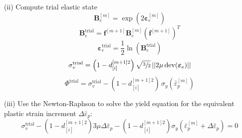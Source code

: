 \documentclass[sn-mathphys,Numbered]{sn-jnl}%
\newcommand{\bb}{\boldsymbol}
\begin{document}
\begin{appendices}
\begin{algorithm}[htbp]
(ii) Compute trial elastic state
\begin{equation}
	\bb{B}_{e}^{[m]} = \exp\left({2\boldsymbol{\varepsilon}_{e}^{[m]}}\right) \nonumber
\end{equation}
\begin{equation}
	\bb{B}^{\text{trial}}_e = \bb{f}^{[m+1]}\bb{B}^{[m]}_e \left(\bb{f}^{[m+1]}\right)^{T}\nonumber
\end{equation}
\begin{equation}
	\boldsymbol{\varepsilon}^{\text{trial}}_e = \frac{1}{2} \ln \left(\textbf{B}^{\text{trial}}_e \right) \nonumber
\end{equation}
\begin{equation}
	\sigma_v^{\text{trial}} =
	\left(1 - d_{[i]}^{[m+1]2} \right) \sqrt{\sfrac{3}{2}} \, || 2\mu \, \text{dev}(\bb{\varepsilon}_e)|| \nonumber
\end{equation}
\begin{equation}
	\Phi^{\text{trial}} =
	\sigma_v^{\text{trial}}
	- \left(1 - d_{[i]}^{[m+1]2} \right) \, \sigma_{y}\left(\bar{\varepsilon}_p^{[m]} \right) \nonumber 
\end{equation}

(iii) Use the Newton-Raphson to solve the yield equation for the equivalent plastic strain increment $\Delta\bar{\varepsilon}_p$:
\begin{equation}
	\sigma_v^{\text{trial}}
	- \left(1 - d_{[i]}^{[m+1]2} \right) 3 \mu\Delta\bar{\varepsilon}_p
	- \left(1 - d_{[i]}^{[m+1]2} \right) \sigma_{y}(\bar{\varepsilon}_{p}^{[m]} + \Delta\bar{\varepsilon}_p)
	= 0 \nonumber
\end{equation}



\end{algorithm}
\end{appendices}
\end{document}
